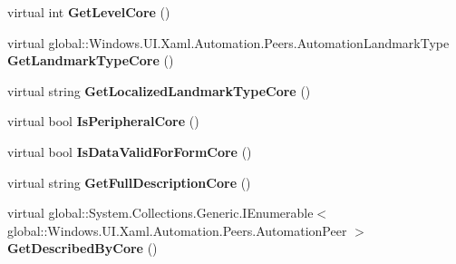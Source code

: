 \begin{DoxyCompactItemize}
\item 
\mbox{\label{class_windows_1_1_u_i_1_1_xaml_1_1_automation_1_1_peers_1_1_automation_peer_aa68b2502b978bd14d3692f0943c7ebe2}} 
virtual int {\bfseries Get\+Level\+Core} ()
\item 
\mbox{\label{class_windows_1_1_u_i_1_1_xaml_1_1_automation_1_1_peers_1_1_automation_peer_a16b5c59f62d9cfb375b06085b3ebface}} 
virtual global\+::\+Windows.\+U\+I.\+Xaml.\+Automation.\+Peers.\+Automation\+Landmark\+Type {\bfseries Get\+Landmark\+Type\+Core} ()
\item 
\mbox{\label{class_windows_1_1_u_i_1_1_xaml_1_1_automation_1_1_peers_1_1_automation_peer_a81ded2ee8cb403207b5438e524931e09}} 
virtual string {\bfseries Get\+Localized\+Landmark\+Type\+Core} ()
\item 
\mbox{\label{class_windows_1_1_u_i_1_1_xaml_1_1_automation_1_1_peers_1_1_automation_peer_a5868d299d4d9698f50f5f3af851f85d2}} 
virtual bool {\bfseries Is\+Peripheral\+Core} ()
\item 
\mbox{\label{class_windows_1_1_u_i_1_1_xaml_1_1_automation_1_1_peers_1_1_automation_peer_a375e173803947dba5bb2ee40016d54e9}} 
virtual bool {\bfseries Is\+Data\+Valid\+For\+Form\+Core} ()
\item 
\mbox{\label{class_windows_1_1_u_i_1_1_xaml_1_1_automation_1_1_peers_1_1_automation_peer_a03e2b030728b5480baca09928e51811f}} 
virtual string {\bfseries Get\+Full\+Description\+Core} ()
\item 
\mbox{\label{class_windows_1_1_u_i_1_1_xaml_1_1_automation_1_1_peers_1_1_automation_peer_af229ab1160fae56261351af4e4f4e4ab}} 
virtual global\+::\+System.\+Collections.\+Generic.\+I\+Enumerable$<$ global\+::\+Windows.\+U\+I.\+Xaml.\+Automation.\+Peers.\+Automation\+Peer $>$ {\bfseries Get\+Described\+By\+Core} ()

\end{DoxyCompactItemize}
